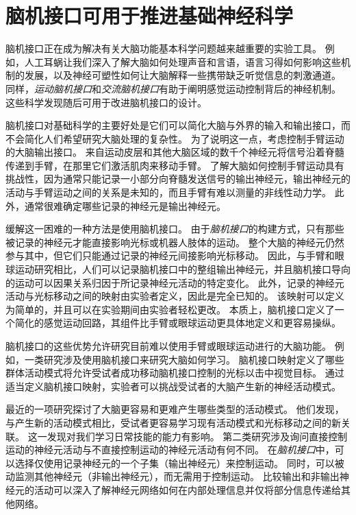 \section{脑机接口可用于推进基础神经科学}

脑机接口正在成为解决有关大脑功能基本科学问题越来越重要的实验工具。
例如，人工耳蜗让我们深入了解大脑如何处理声音和言语，语言习得如何影响这些机制的发展，以及神经可塑性如何让大脑解释一些携带缺乏听觉信息的刺激通道。
同样，\textit{运动脑机接口}和\textit{交流脑机接口}有助于阐明感觉运动控制背后的神经机制。
这些科学发现随后可用于改进脑机接口的设计。


脑机接口对基础科学的主要好处是它们可以简化大脑与外界的输入和输出接口，而不会简化人们希望研究大脑处理的复杂性。
为了说明这一点，考虑控制手臂运动的大脑输出接口。
来自运动皮层和其他大脑区域的数千个神经元将信号沿着脊髓传递到手臂，在那里它们激活肌肉来移动手臂。
了解大脑如何控制手臂运动具有挑战性，因为通常只能记录一小部分向脊髓发送信号的输出神经元，输出神经元的活动与手臂运动之间的关系是未知的，而且手臂有难以测量的非线性动力学。
此外，通常很难确定哪些记录的神经元是输出神经元。


缓解这一困难的一种方法是使用脑机接口。
由于\textit{脑机接口}的构建方式，只有那些被记录的神经元才能直接影响光标或机器人肢体的运动。
整个大脑的神经元仍然参与其中，但它们只能通过记录的神经元间接影响光标移动。
因此，与手臂和眼球运动研究相比，人们可以记录脑机接口中的整组输出神经元，并且脑机接口导向的运动可以因果关系归因于所记录神经元活动的特定变化。
此外，记录的神经元活动与光标移动之间的映射由实验者定义，因此是完全已知的。
该映射可以定义为简单的，并且可以在实验期间由实验者轻松更改。
本质上，脑机接口定义了一个简化的感觉运动回路，其组件比手臂或眼球运动更具体地定义和更容易操纵。


脑机接口的这些优势允许研究目前难以使用手臂或眼球运动进行的大脑功能。
例如，一类研究涉及使用脑机接口来研究大脑如何学习。 
脑机接口映射定义了哪些群体活动模式将允许受试者成功移动脑机接口控制的光标以击中视觉目标。
通过适当定义脑机接口映射，实验者可以挑战受试者的大脑产生新的神经活动模式。


最近的一项研究探讨了大脑更容易和更难产生哪些类型的活动模式。
他们发现，与产生新的活动模式相比，受试者更容易学习现有活动模式和光标移动之间的新关联。
这一发现对我们学习日常技能的能力有影响。
第二类研究涉及询问直接控制运动的神经元活动与不直接控制运动的神经元活动有何不同。
在\textit{脑机接口}中，可以选择仅使用记录神经元的一个子集（输出神经元）来控制运动。
同时，可以被动监测其他神经元（非输出神经元），而无需用于控制运动。
比较输出和非输出神经元的活动可以深入了解神经元网络如何在内部处理信息并仅将部分信息传递给其他网络。


